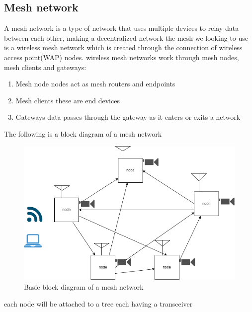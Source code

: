 	\subsection{Mesh network}
	A mesh network is a type of network that uses multiple devices to relay data between each other, making a decentralized network
	the mesh we looking to use is a wireless mesh network which is  created through the connection of wireless access point(WAP) nodes.
	wireless mesh networks work through mesh nodes, mesh clients and gateways:
	\begin{enumerate}
		\item Mesh node
		nodes act as mesh routers and endpoints
		\item Mesh clients
		these are  end devices
		\item Gateways
		data passes through the gateway as it enters or exits a network
	\end{enumerate}
	The following is  a block diagram   of a mesh network
	\begin{figure}[h!]
	    \begin{center}			
	    \includegraphics[width=0.5\linewidth]{Images/basic mesh network diagram.png}\par
	    \caption{Basic block diagram of a mesh network}
	
	    \label{Basic block diagram of a mesh network}
	     \end{center}
	\end{figure}
	each node will be attached to a tree  each having a transceiver